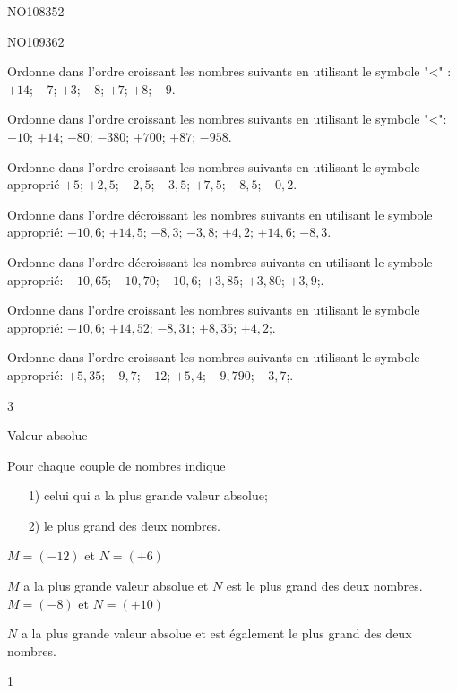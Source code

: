 \documentclass[a4paper,11pt]{report}
\begin{document}
\begin{exol}{NO108}{35}{2}
\end{exol}
\begin{exol}{NO109}{36}{2}
\end{exol}

\begin{exop}
{\begin{tasks}[after-item-skip = 0.2em]
\task Ordonne dans l'ordre croissant les nombres suivants en utilisant le symbole "<" :  $+14$; $-7$; $+3$; $-8$; $+7$; $+8$; $-9$.

	\dotfill
\task Ordonne dans l'ordre croissant les nombres suivants en utilisant le symbole "<":  $-10$; $+14$; $-80$; $-380$; $+700$; $+87$; $-958$.

\dotfill
\task Ordonne dans l'ordre croissant les nombres suivants en utilisant le symbole approprié  $+5$; $+2,5$; $-2,5$; $-3,5$; $+7,5$; $-8,5$; $-0,2$.

	\dotfill
\task Ordonne dans l'ordre décroissant les nombres suivants en utilisant le symbole approprié:  $-10,6$; $+14,5$; $-8,3$; $-3,8$; $+4,2$; $+14,6$; $-8,3$.

	\dotfill
\task Ordonne dans l'ordre décroissant les nombres suivants en utilisant le symbole approprié: $-10,65$; $-10,70$; $-10,6$; $+3,85$; $+3,80$; $+3,9$;.

	\dotfill
\task Ordonne dans l'ordre croissant les nombres suivants en utilisant le symbole approprié:  $-10,6$; $+14,52$; $-8,31$; $+8,35$; $+4,2$;.

	\dotfill
\task Ordonne dans l'ordre croissant les nombres suivants en utilisant le symbole approprié:  $+5,35$; $-9,7$; $-12$; $+5,4$; $-9,790$; $+3,7$;.

	\dotfill
\end{tasks}}
{3}
\end{exop}

\begin{resolu}{ Valeur absolue}{
Pour chaque couple de nombres indique 
\begin{enumerate}[itemsep=5pt]
	\item[1)] celui qui a la plus grande valeur absolue;
	\item[2)] le plus grand des deux nombres.
\end{enumerate}
\begin{tasks}
    \task $M=(-12)$ et $N=(+6)$
    
    $M$ a la plus grande valeur absolue et $N$ est le plus grand des deux nombres.
    \task $M=(-8)$ et $N=(+10)$

     $N$ a la plus grande valeur absolue et est également le plus grand des deux nombres.
\end{tasks}}
{1}
\end{resolu}
\end{document}
